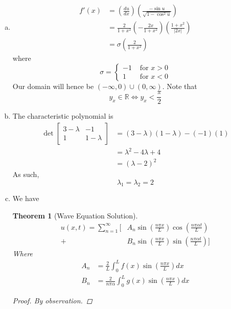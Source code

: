 \documentclass[11pt,a4paper]{article}
\newtheorem{theorem}{Theorem}
\begin{document}
\begin{enumerate}[a)]
\item
    \begin{align*}
        f'(x) &= \left(\frac{du}{dx}\right) \left( \frac{-\sin{u}}{\sqrt{1-\cos^2{u}}} \right) \\
        &= \frac{2}{1+x^2} \left( - \frac{2x}{1+x^2} \right) \left( \frac{1+x^2}{|2x|} \right) \tag{for $x\neq 0$}\\
        &= \sigma\left(\frac{2}{1+x^2}\right) 
    \end{align*}
    where
    \[ \sigma =\begin{cases}
                    -1 & \text{ for } x>0\\
                    1  & \text{ for } x<0
                \end{cases}
    \]
    Our domain will hence be $(-\infty, 0) \cup (0, \infty)$. Note that
    \[
        y_x \in \mathbb{R} \iff y_x < \frac{\pi}{2}
    \]

\item
    The characteristic polynomial is
    \begin{align*}
        \det \begin{bmatrix}
            3 - \lambda & -1 \\
            1 & 1 - \lambda
        \end{bmatrix} &= (3 - \lambda)(1 - \lambda) - (-1)(1) \\
        &= \lambda^2 - 4\lambda + 4 \\
        &= (\lambda - 2)^2
      \end{align*}
      As such,
      \[
        \lambda_1 = \lambda_2 = 2
      \]

\item
    We have
    \begin{theorem}[Wave Equation Solution]
    \begin{align*}
        u(x, t) =  \sum_{n = 1}^\infty \Big[ &A_n \sin\left(\frac{n\pi x}{L} \right) \cos\left(\frac{n\pi \alpha t}{L} \right) \\
        + &B_n \sin\left(\frac{n\pi x}{L} \right) \sin \left(\frac{n\pi \alpha t}{L} \right)\Big] \tag{1}
    \end{align*}
    Where
    \begin{align*}
        A_n &= \frac{2}{L}\int_0^L f(x) \sin\left(\frac{n\pi x}{L} \right) dx \\
        B_n &= \frac{2}{n\pi \alpha}\int_0^L g(x) \sin\left(\frac{n\pi x}{L} \right) dx
    \end{align*}
    \begin{proof}
        By observation.
    \end{proof}
    \end{theorem}
\end{enumerate}
\end{document}
